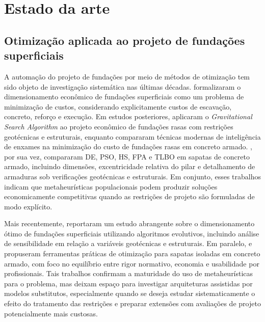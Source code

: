 \section{Estado da arte}
\label{sec:estado_da_arte}

\subsection{Otimização aplicada ao projeto de fundações superficiais}
\label{sec:soa_fundacoes}

A automação do projeto de fundações por meio de métodos de otimização tem sido objeto de investigação sistemática nas últimas décadas.  formalizaram o dimensionamento econômico de fundações superficiais como um problema de minimização de custos, considerando explicitamente custos de escavação, concreto, reforço e execução. Em estudos posteriores,  aplicaram o \textit{Gravitational Search Algorithm} ao projeto econômico de fundações rasas com restrições geotécnicas e estruturais, enquanto  compararam técnicas modernas de inteligência de enxames na minimização do custo de fundações rasas em concreto armado. , por sua vez, compararam DE, PSO, HS, FPA e TLBO em sapatas de concreto armado, incluindo dimensões, excentricidade relativa do pilar e detalhamento de armaduras sob verificações geotécnicas e estruturais. Em conjunto, esses trabalhos indicam que metaheurísticas populacionais podem produzir soluções economicamente competitivas quando as restrições de projeto são formuladas de modo explícito.

Mais recentemente,  reportaram um estudo abrangente sobre o dimensionamento ótimo de fundações superficiais utilizando algoritmos evolutivos, incluindo análise de sensibilidade em relação a variáveis geotécnicas e estruturais. Em paralelo,  e  propuseram ferramentas práticas de otimização para sapatas isoladas em concreto armado, com foco no equilíbrio entre rigor normativo, economia e usabilidade por profissionais. Tais trabalhos confirmam a maturidade do uso de metaheurísticas para o problema, mas deixam espaço para investigar arquiteturas assistidas por modelos substitutos, especialmente quando se deseja estudar sistematicamente o efeito do tratamento das restrições e preparar extensões com avaliações de projeto potencialmente mais custosas.

